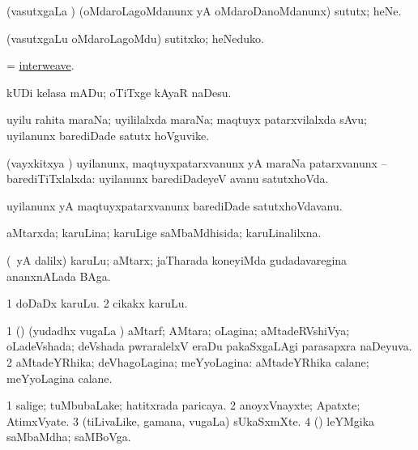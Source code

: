 \bentry
{}
\gl{\kirx}
\bmng
 \sakirx (vasutxgaLa \vi) (oMdaroLagoMdanunx yA oMdaroDanoMdanunx) sututx; heNe. 
\emng

\noindent 
\gl{\akirx}
\bmng
(vasutxgaLu oMdaroLagoMdu) sutitxko; heNeduko. 
\emng
\eentry

\bentry
{}
\gl{\sakirx}
\bmng
=  \hyperlink{interweave}{interweave}. 
\emng

\noindent 
\gl{\akirx}
\bmng
kUDi kelasa mADu; oTiTxge kAyaR naDesu. 
\emng
\eentry

\bentry
{}
\gl{\nA}
\bmng
uyilu rahita maraNa; uyililalxda maraNa; maqtuyx patarxvilalxda sAvu; uyilanunx barediDade satutx hoVguvike. 
\emng
\eentry

\bentry
{}
\gl{\gu}
\bmng
(vayxkitxya \vi) uyilanunx, maqtuyxpatarxvanunx yA maraNa patarxvanunx -- barediTiTxlalxda:  uyilanunx barediDadeyeV avanu satutxhoVda. 
\emng
\eentry

\bentry
{}
\gl{\nA}
\bmng
uyilanunx yA maqtuyxpatarxvanunx barediDade satutxhoVdavanu. 
\emng
\eentry

\bentry
{}
\gl{\gu}
\bmng
aMtarxda; karuLina; karuLige saMbaMdhisida; karuLinalilxna. 
\emng
\eentry

\bentry
{}
\gl{\nA}
\bmng
(\Eva\ yA \bava dalilx) karuLu; aMtarx; jaTharada koneyiMda gudadavaregina ananxnALada BAga. 
\emng

\noindent
\gl{\pagu}
\bmng
\bnum
\num{1}  doDaDx karuLu. 
\num{2}  cikakx karuLu. 
\enum
\emng
\eentry

\bentry
{}
\gl{\gu}
\bmng
\bnum
\num{1} (\pArxparx) (yudadhx \mo vugaLa \vi) aMtarf; AMtara; oLagina; aMtadeRVshiVya; oLadeVshada; deVshada pwraralelxV eraDu pakaSxgaLAgi parasapxra naDeyuva. 
\num{2} aMtadeYRhika; deVhagoLagina; meYyoLagina:  aMtadeYRhika calane; meYyoLagina calane. 
\enum
\emng
\eentry

\bentry
{}
\gl{\nA}
\bmng
\bnum
\num{1} salige; tuMbubaLake; hatitxrada paricaya. 
\num{2} anoyxVnayxte; Apatxte; AtimxVyate. 
\num{3} (tiLivaLike, gamana, \mo vugaLa) sUkaSxmXte. 
\num{4} (\sw) leYMgika saMbaMdha; saMBoVga. 
\enum
\emng
\eentry

